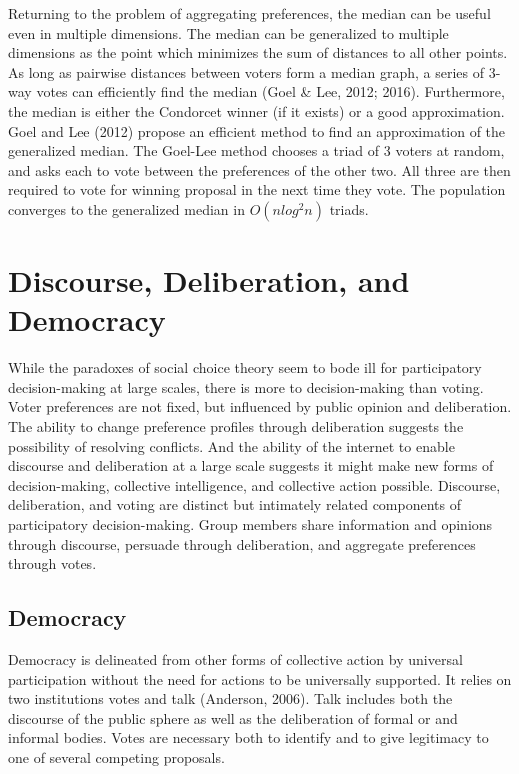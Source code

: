Returning to the problem of aggregating preferences, the median can be useful even in multiple dimensions. The median can be generalized to multiple dimensions as the point which minimizes the sum of distances to all other points. As long as pairwise distances between voters form a median graph, a series of 3-way votes can efficiently find the median (Goel \& Lee, 2012; 2016). Furthermore, the median is either the Condorcet winner (if it exists) or a good approximation. Goel and Lee (2012) propose an efficient method to find an approximation of the generalized median. The Goel-Lee method chooses a triad of 3 voters at random, and asks each to vote between the preferences of the other two. All three are then required to vote for winning proposal in the next time they vote. The population converges to the generalized median in $O(n log^2 n)$ triads.

\section{Discourse, Deliberation, and Democracy}
While the paradoxes of social choice theory seem to bode ill for participatory decision-making at large scales, there is more to decision-making than voting. Voter preferences are not fixed, but influenced by public opinion and deliberation. The ability to change preference profiles through deliberation suggests the possibility of resolving conflicts. And the ability of the internet to enable discourse and deliberation at a large scale suggests it might make new forms of decision-making, collective intelligence, and collective action possible. Discourse, deliberation, and voting are distinct but intimately related components of participatory decision-making. Group members share information and opinions through discourse, persuade through deliberation, and aggregate preferences through votes.

\subsection{Democracy}
Democracy is delineated from other forms of collective action by universal participation without the need for actions to be universally supported. It relies on two institutions votes and talk (Anderson, 2006). Talk includes both the discourse of the public sphere as well as the deliberation of formal or and informal bodies. Votes are necessary both to identify and to give legitimacy to one of several competing proposals.

